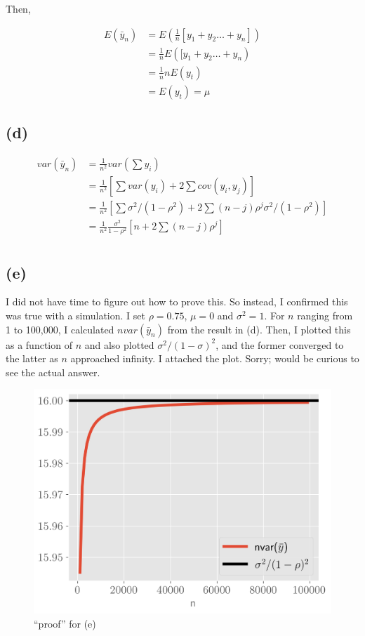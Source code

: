 \documentclass[11pt]{article}
\begin{document}
Then,

\begin{align*}
    E(\bar{y}_n) &= E(\frac{1}{n}[y_1 + y_2 \ldots + y_n])\\
    &= \frac{1}{n} E([y_1 + y_2 \ldots + y_n)\\
    &= \frac{1}{n} nE(y_t)\\
    &= E(y_t) = \mu
\end{align*}



\subsection*{(d)}
\begin{align*}
var(\bar{y}_n) &= \frac{1}{n^2}var(\sum y_i)\\
&= \frac{1}{n^2}[\sum var(y_i) + 2\sum cov(y_i, y_j)]\\  
&= \frac{1}{n^2}[\sum \sigma^2/(1-\rho^2) + 2\sum   (n-j)\rho^j \sigma^2/(1-\rho^2)]\\
&= \frac{1}{n^2}\frac{\sigma^2}{1-\rho^2}[n  + 2\sum   (n-j)\rho^j] \\
\end{align*}





\subsection*{(e)} I did not have time to figure out how to prove this. So instead, I confirmed this was true with a simulation. I set $\rho = 0.75$, $\mu=0$ and $\sigma^2 = 1$. For $n$ ranging from 1 to 100,000, I calculated $nvar(\bar{y}_n)$ from the result in (d). Then, I plotted this as a function of $n$ and also plotted $\sigma^2/(1-\sigma)^2$, and the former converged to the latter as $n$ approached infinity. I attached the plot. Sorry; would be curious to see the actual answer.


\begin{figure}[!h]
    \centering
    \includegraphics[scale=.5
    ]{../figures/e.png}
    \caption{``proof'' for (e)}
    \label{fig:my_label}
\end{figure}
\end{document}
